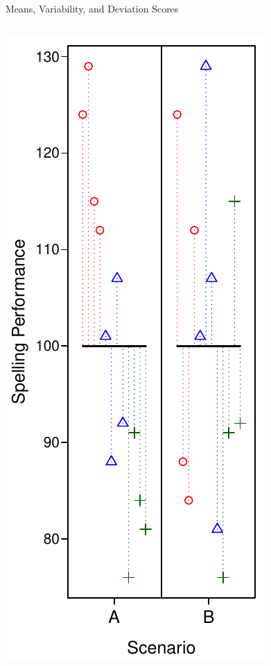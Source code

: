 \documentclass[presentation]{beamer}
\begin{document}
\begin{frame}[label={sec:orgdc8b882}]{Means, Variability, and Deviation Scores}
\begin{columns}
\begin{column}{.3\columnwidth}
\includegraphics[width=.9\linewidth]{08_glm_img/spelling-02.pdf}
\end{column}


\end{columns}
\end{frame}
\end{document}
